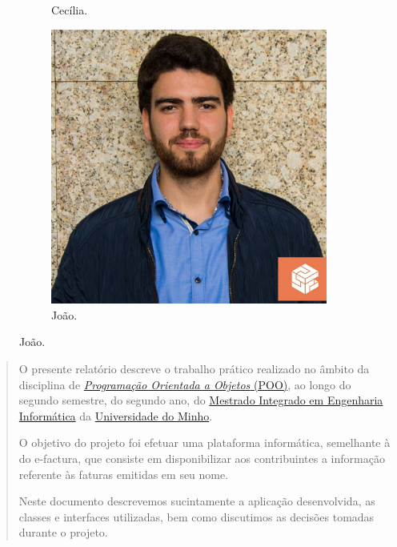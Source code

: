 \documentclass[a4paper]{article}
\begin{document}
\begin{titlepage}
\begin{figure}[h!]
\begin{subfigure}[b]{0.2\linewidth}
      \caption{Cecília.}
    \end{subfigure}
    \begin{subfigure}[b]{0.2\linewidth}
      \includegraphics[width=\linewidth]{imgs/joao.jpeg}
      \caption{João.}
    \end{subfigure}
  \end{figure}


  \clearpage

 \end{titlepage}


\begin{abstract}
O presente relatório descreve o trabalho prático realizado no âmbito da disciplina de
\href{http://miei.di.uminho.pt/plano_estudos.html#programa_o_orientada_aos_objetos}
{\emph {Programação Orientada a Objetos} (POO)}, ao longo do segundo semestre,
do segundo ano, do \href{http://miei.di.uminho.pt}{Mestrado Integrado em Engenharia Informática}
da \href{https://www.uminho.pt}{Universidade do Minho}.

O objetivo do projeto foi efetuar uma plataforma informática, semelhante
à do e-factura,
que consiste em disponibilizar aos contribuintes a informação referente às faturas
emitidas em seu nome.

Neste documento descrevemos sucintamente a aplicação desenvolvida, as classes
e interfaces utilizadas, bem como discutimos as decisões tomadas durante o
projeto.

\end{abstract}
\end{document}

